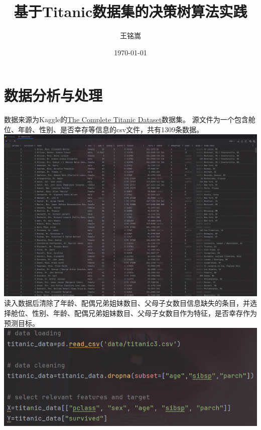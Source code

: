 \documentclass{article}
\title{基于Titanic数据集的决策树算法实践}
\author{王铭嵩}
\date{\today}
\begin{document}
\maketitle
\newpage
\section{数据分析与处理}
数据来源为Kaggle的\href{https://www.kaggle.com/datasets/vinicius150987/titanic3}{The Complete Titanic Dataset}数据集。
源文件为一个包含舱位、年龄、性别、是否幸存等信息的csv文件，共有1309条数据。\\
\includegraphics[width=1.0\textwidth]{code_screenshot/datasrc.png}\\
读入数据后清除了年龄、配偶兄弟姐妹数目、父母子女数目信息缺失的条目，并选择舱位、性别、年龄、配偶兄弟姐妹数目、父母子女数目作为特征，是否幸存作为预测目标。\\
\includegraphics[width=1.0\textwidth]{code_screenshot/dataclean.png}\\
\end{document}
